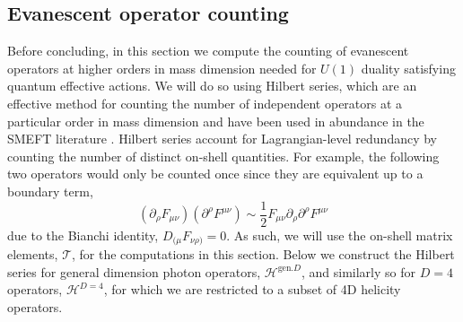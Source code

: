 \documentclass[11pt,letter]{article}
\begin{document}
\subsection{Evanescent operator counting}\label{sec:EOpsCounting}
Before concluding, in this section we compute the counting of evanescent operators at higher orders in mass dimension needed for $U(1)$ duality satisfying quantum effective actions. We will do so using Hilbert series, which are an effective method for counting the number of independent operators at a particular order in mass dimension \cite{Henning:2015daa,Lehman:2015via} and have been used in abundance in the SMEFT literature \cite{Fonseca:2019yya,Hays:2018zze,Alioli:2022fng}. Hilbert series account for Lagrangian-level redundancy by counting the number of distinct on-shell quantities. For example, the following two operators would only be counted once since they are equivalent up to a boundary term,
\begin{equation}
(\partial_\rho F_{\mu\nu})(\partial^\rho F^{\mu\nu}) \sim \frac{1}{2}F_{\mu\nu}\partial_\rho \partial^\rho F^{\mu\nu}
\end{equation}
due to the Bianchi identity, $D_{(\mu} F_{\nu \rho)} = 0$. As such, we will use the on-shell matrix elements, $\mathcal{T}$, for the computations in this section. Below we construct the Hilbert series for general dimension photon operators, $\mathcal{H}^{\text{gen.}D}$, and similarly so for $D=4$ operators, $\mathcal{H}^{D=4}$, for which we are restricted to a subset of 4D helicity operators. 
\end{document}

